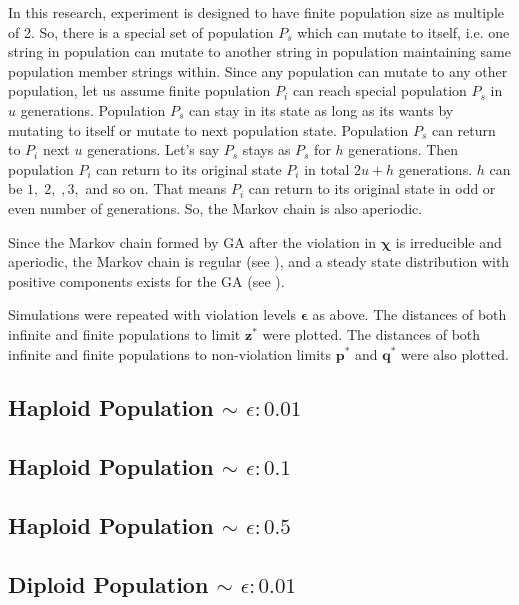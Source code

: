 In this research, experiment is designed to have finite population size as multiple of 2. 
So, there is a special set of population $P_s$ which can mutate to itself, i.e. one string in 
population can mutate to another string in population maintaining same population member strings within. 
Since any population can mutate to any other population, let us assume finite population $P_i$ 
can reach special population $P_s$ in $u$ generations. Population $P_s$ can stay in its state as long as its wants 
by mutating to itself or mutate to next population state. Population $P_s$ can return to $P_i$ next $u$ generations. 
Let's say $P_s$ stays as $P_s$ for $h$ generations. Then population $P_i$ can return to its original state $P_i$ 
in total $2u+h$ generations. $h$ can be $1, \; 2, \;, 3,$ and so on. That means $P_i$ can return to its original state in 
odd or even number of generations. So, the Markov chain is also aperiodic.

Since the Markov chain formed by GA after the violation in $\bm{\chi}$ is irreducible and aperiodic, 
the Markov chain is regular (see \cite{Iosifescu1980}), and a steady state distribution 
with positive components exists for the GA (see \cite{Minc1988}). 

Simulations were repeated with violation levels $\bm{\epsilon}$ as above.
The distances of both infinite and finite populations to limit $\bm{z}^\ast$ were plotted. 
The distances of both infinite and finite populations to non-violation limits $\bm{p}^\ast$ and $\bm{q}^\ast$ were also plotted.

\subsection{Haploid Population $\mathtt{\sim}$ $\epsilon: 0.01$}

\subsection{Haploid Population $\mathtt{\sim}$ $\epsilon: 0.1$}

\subsection{Haploid Population $\mathtt{\sim}$ $\epsilon: 0.5$}


\subsection{Diploid Population $\mathtt{\sim}$ $\epsilon: 0.01$}

